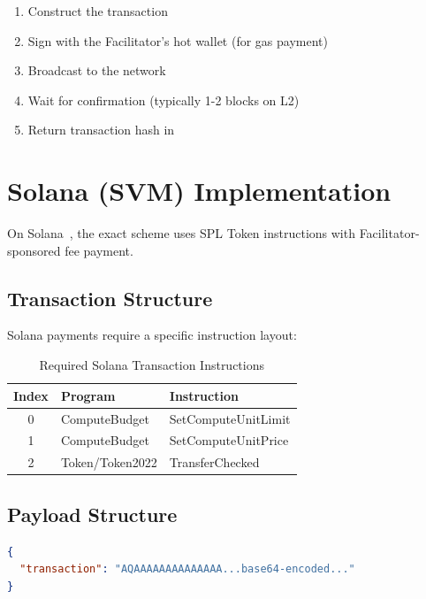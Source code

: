 \begin{enumerate}
    \item Construct the  transaction
    \item Sign with the Facilitator's hot wallet (for gas payment)
    \item Broadcast to the network
    \item Wait for confirmation (typically 1-2 blocks on L2)
    \item Return transaction hash in 
\end{enumerate}

\section{Solana (SVM) Implementation}
\label{sec:solana-implementation}

On Solana~\cite{solana}, the exact scheme uses SPL Token  instructions with Facilitator-sponsored fee payment.

\subsection{Transaction Structure}

Solana payments require a specific instruction layout:

\begin{table}[htbp]
\centering
\caption{Required Solana Transaction Instructions}
\label{tab:solana-instructions}
\begin{tabular}{clp{6cm}}
\toprule
\textbf{Index} & \textbf{Program} & \textbf{Instruction} \\
\midrule
0 & ComputeBudget & SetComputeUnitLimit \\
1 & ComputeBudget & SetComputeUnitPrice \\
2 & Token/Token2022 & TransferChecked \\
\bottomrule
\end{tabular}
\end{table}

\subsection{Payload Structure}

\begin{lstlisting}[language=json,caption={Solana exact scheme payload}]
{
  "transaction": "AQAAAAAAAAAAAAAA...base64-encoded..."
}
\end{lstlisting}

